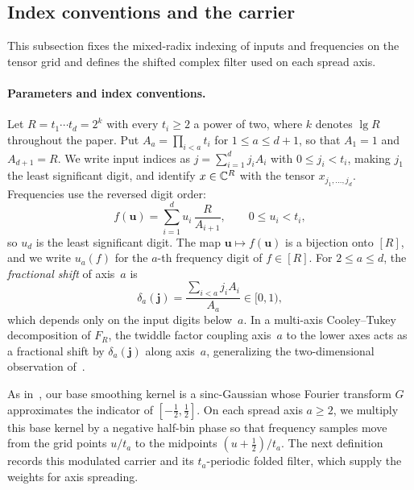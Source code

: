 \subsection{Index conventions and the carrier}\label{sec:bridge-conventions}

This subsection fixes the mixed-radix indexing of inputs and frequencies on the tensor grid and defines the shifted
complex filter used on each spread axis.

\paragraph{Parameters and index conventions.}
Let $R=t_1\cdots t_d=2^k$ with every $t_i\ge 2$ a power of two, where $k$ denotes $\lg R$ throughout the paper. Put
$A_a=\prod_{i<a}t_i$ for $1\le a\le d+1$, so that $A_1=1$ and $A_{d+1}=R$. We write input indices as
$j=\sum_{i=1}^d j_i A_i$ with $0\le j_i<t_i$, making $j_1$ the least significant digit, and identify $x\in\mathbb{C}^R$ with
the tensor $x_{j_1,\dots,j_d}$. Frequencies use the reversed digit order:
\begin{equation}\label{eq:freq-digits}
  f(\mathbf u)=\sum_{i=1}^d u_i\,\frac{R}{A_{i+1}},\qquad 0\le u_i<t_i,
\end{equation}
so $u_d$ is the least significant digit. The map $\mathbf u\mapsto f(\mathbf u)$ is a bijection onto $[R]$, and we write
$u_a(f)$ for the $a$-th frequency digit of $f\in[R]$. For $2\le a\le d$, the \emph{fractional shift} of axis~$a$ is
\begin{equation}\label{eq:delta}
  \delta_a(\mathbf j)=\frac{\sum_{i<a}j_i A_i}{A_a}\in[0,1),
\end{equation}
which depends only on the input digits below~$a$. In a multi-axis Cooley--Tukey decomposition of $F_R$, the twiddle
factor coupling axis~$a$ to the lower axes acts as a fractional shift by $\delta_a(\mathbf j)$ along axis~$a$,
generalizing the two-dimensional observation of~\cite{MS}.

As in~\cite{MS}, our base smoothing kernel is a sinc-Gaussian whose Fourier transform $G$ approximates the indicator of
$[-\tfrac12,\tfrac12]$. On each spread axis $a\ge 2$, we multiply this base kernel by a negative half-bin phase so that
frequency samples move from the grid points $u/t_a$ to the midpoints $(u+\tfrac12)/t_a$. The next definition records
this modulated carrier and its $t_a$-periodic folded filter, which supply the weights for axis spreading.

